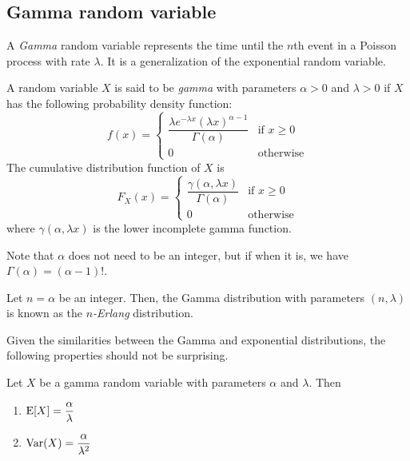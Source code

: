 \documentclass{article}
\begin{document}
\subsection{Gamma random variable}

A \emph{Gamma} random variable represents the time until the $n$th event in a Poisson process with rate $\lambda$.
It is a generalization of the exponential random variable.

\begin{definition}
  A random variable $X$ is said to be \emph{gamma} with parameters $\alpha > 0$ and $\lambda > 0$ if $X$ has the following probability density function:
  \[
    f(x) = \begin{cases}
      \dfrac{\lambda e^{-\lambda x} (\lambda x)^{\alpha - 1}}{\Gamma(\alpha)} & \text{if } x \geq 0 \\
      0                                                                       & \text{otherwise}
    \end{cases}
  \]
  The cumulative distribution function of $X$ is
  \[
    F_X(x) = \begin{cases}
      \dfrac{\gamma(\alpha, \lambda x)}{\Gamma(\alpha)} & \text{if } x \geq 0 \\
      0                                                 & \text{otherwise}
    \end{cases}
  \]
  where $\gamma(\alpha, \lambda x)$ is the lower incomplete gamma function.
\end{definition}
Note that $\alpha$ does not need to be an integer, but if when it is, we have $\Gamma(\alpha) = (\alpha - 1)!$.

\begin{remark}
  Let $n = \alpha$ be an integer.
  Then, the Gamma distribution with parameters $(n, \lambda)$ is known as the \emph{$n$-Erlang} distribution.
\end{remark}

Given the similarities between the Gamma and exponential distributions, the following properties should not be surprising.
\begin{proposition}
  Let $X$ be a gamma random variable with parameters $\alpha$ and $\lambda$.
  Then
  \begin{enumerate}
    \item $\operatorname{E}[X] = \dfrac{\alpha}{\lambda}$
    \item $\operatorname{Var}(X) = \dfrac{\alpha}{\lambda^2}$
  \end{enumerate}
\end{proposition}
\end{document}
